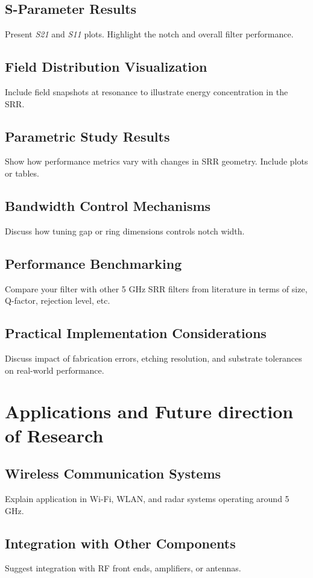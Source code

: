 \documentclass[conference]{IEEEtran}
\begin{document}
\subsection{S-Parameter Results}
Present \textit{S21} and \textit{S11} plots. Highlight the notch and overall filter performance.

\subsection{Field Distribution Visualization}
Include field snapshots at resonance to illustrate energy concentration in the SRR.

\subsection{Parametric Study Results}
Show how performance metrics vary with changes in SRR geometry. Include plots or tables.

\subsection{Bandwidth Control Mechanisms}
Discuss how tuning gap or ring dimensions controls notch width.

\subsection{Performance Benchmarking}
Compare your filter with other 5 GHz SRR filters from literature in terms of size, Q-factor, rejection level, etc.

\subsection{Practical Implementation Considerations}
Discuss impact of fabrication errors, etching resolution, and substrate tolerances on real-world performance.

\section{Applications and Future direction of Research}

\subsection{Wireless Communication Systems}
Explain application in Wi-Fi, WLAN, and radar systems operating around 5 GHz.

\subsection{Integration with Other Components}
Suggest integration with RF front ends, amplifiers, or antennas.
\end{document}
